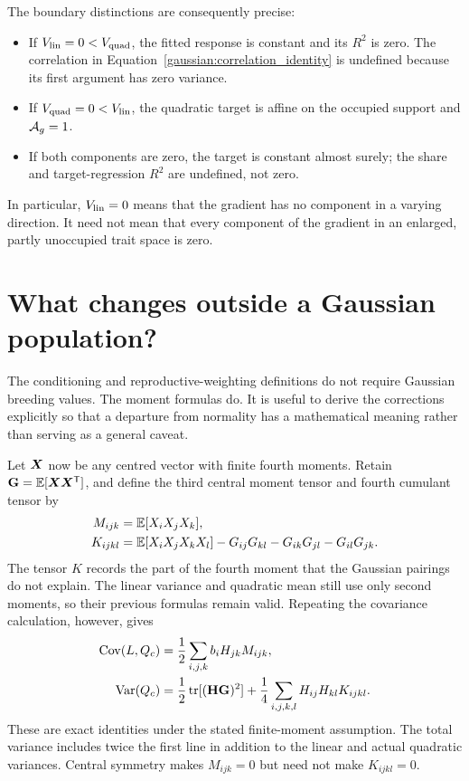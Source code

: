 The boundary distinctions are consequently precise:
\begin{itemize}
\item If $V_{\mathrm{lin}}=0<V_{\mathrm{quad}}$, the fitted response is constant and its $R^2$
is zero. The correlation in Equation~\eqref{gaussian:correlation_identity}
is undefined because its first argument has zero variance.
\item If $V_{\mathrm{quad}}=0<V_{\mathrm{lin}}$, the quadratic target is affine on the occupied
support and $\mathcal A_g=1$.
\item If both components are zero, the target is constant almost surely;
the share and target-regression $R^2$ are undefined, not zero.
\end{itemize}
In particular, $V_{\mathrm{lin}}=0$ means that the gradient has no component in a
varying direction. It need not mean that every component of the gradient
in an enlarged, partly unoccupied trait space is zero.

\section{What changes outside a Gaussian population?}
\label{gaussian:non_gaussian}

The conditioning and reproductive-weighting definitions do not require
Gaussian breeding values. The moment formulas do. It is useful to derive
the corrections explicitly so that a departure from normality has a
mathematical meaning rather than serving as a general caveat.

Let $\boldsymbol{X}$ now be any centred vector with finite fourth moments. Retain
$\mathbf{G}=\mathbb E[\boldsymbol{X}\boldsymbol{X}^{\mathsf T}]$, and define the third central
moment tensor and fourth cumulant tensor by
\begin{align}
M_{ijk}&=\mathbb E[X_iX_jX_k],\nonumber\\
K_{ijkl}&=\mathbb E[X_iX_jX_kX_l]
 -G_{ij}G_{kl}-G_{ik}G_{jl}-G_{il}G_{jk}.
\label{gaussian:cumulants}
\end{align}
The tensor $K$ records the part of the fourth moment that the Gaussian
pairings do not explain. The linear variance and quadratic mean still use
only second moments, so their previous formulas remain valid. Repeating
the covariance calculation, however, gives
\begin{align}
\operatorname{Cov}(L,Q_c)
 &=\frac12\sum_{i,j,k}b_iH_{jk}M_{ijk},\nonumber\\
\operatorname{Var}(Q_c)
 &=\frac12\operatorname{tr}[(\mathbf{H}\mathbf{G})^2]
   +\frac14\sum_{i,j,k,l}H_{ij}H_{kl}K_{ijkl}.
\label{gaussian:non_gaussian_corrections}
\end{align}
These are exact identities under the stated finite-moment assumption.
The total variance includes twice the first line in addition to the
linear and actual quadratic variances. Central symmetry makes $M_{ijk}=0$
but need not make $K_{ijkl}=0$.

